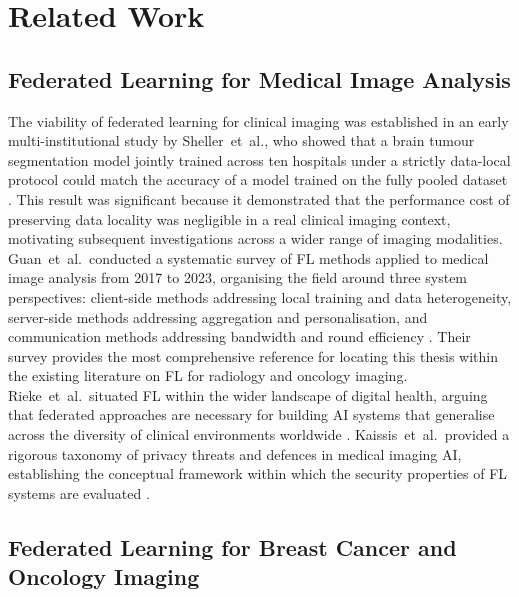 \section{Related Work}
\label{sec:related-work}

\subsection{Federated Learning for Medical Image Analysis}
\label{sec:related-medical-imaging}

The viability of federated learning for clinical imaging was established
in an early multi-institutional study by Sheller~et~al., who showed
that a brain tumour segmentation model jointly trained across ten
hospitals under a strictly data-local protocol could match the accuracy
of a model trained on the fully pooled dataset
\cite{sheller2020federated}.
This result was significant because it demonstrated that the performance
cost of preserving data locality was negligible in a real clinical
imaging context, motivating subsequent investigations across a wider
range of imaging modalities.
Guan~et~al.\ conducted a systematic survey of FL methods applied to
medical image analysis from 2017 to 2023, organising the field
around three system perspectives: client-side methods addressing
local training and data heterogeneity, server-side methods addressing
aggregation and personalisation, and communication methods addressing
bandwidth and round efficiency \cite{guan2024federated}.
Their survey provides the most comprehensive reference for locating
this thesis within the existing literature on FL for radiology and
oncology imaging.
Rieke~et~al.\ situated FL within the wider landscape of digital
health, arguing that federated approaches are necessary for building
AI systems that generalise across the diversity of clinical
environments worldwide \cite{rieke2020future}.
Kaissis~et~al.\ provided a rigorous taxonomy of privacy threats and
defences in medical imaging AI, establishing the conceptual framework
within which the security properties of FL systems are evaluated
\cite{kaissis2020secure}.

\subsection{Federated Learning for Breast Cancer and Oncology Imaging}
\label{sec:related-breast-cancer}

